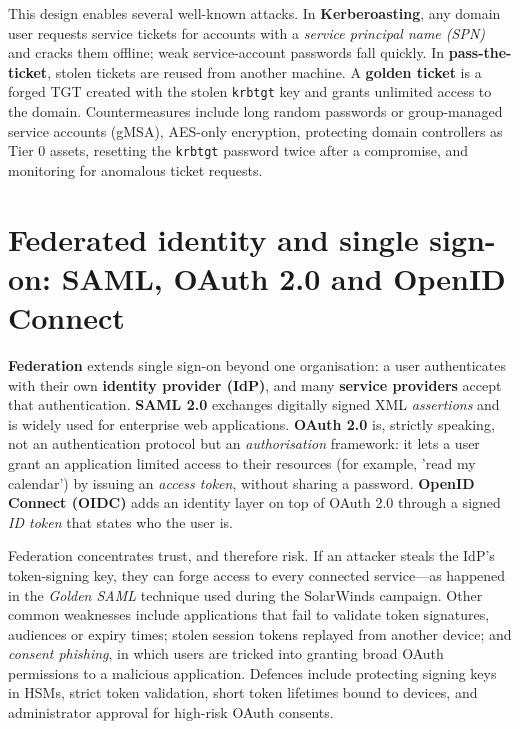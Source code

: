 \documentclass[11pt,openany]{book}
\begin{document}
This design enables several well-known attacks. In \textbf{Kerberoasting}, any domain user requests service tickets for accounts with a \emph{service principal name (SPN)} and cracks them offline; weak service-account passwords fall quickly. In \textbf{pass-the-ticket}, stolen tickets are reused from another machine. A \textbf{golden ticket} is a forged TGT created with the stolen \texttt{krbtgt} key and grants unlimited access to the domain. Countermeasures include long random passwords or group-managed service accounts (gMSA), AES-only encryption, protecting domain controllers as Tier 0 assets, resetting the \texttt{krbtgt} password twice after a compromise, and monitoring for anomalous ticket requests.

\section{Federated identity and single sign-on: SAML, OAuth 2.0 and OpenID Connect}\label{sec:8.6}
\textbf{Federation} extends single sign-on beyond one organisation: a user authenticates with their own \textbf{identity provider (IdP)}, and many \textbf{service providers} accept that authentication. \textbf{SAML 2.0} exchanges digitally signed XML \emph{assertions} and is widely used for enterprise web applications. \textbf{OAuth 2.0} is, strictly speaking, not an authentication protocol but an \emph{authorisation} framework: it lets a user grant an application limited access to their resources (for example, 'read my calendar') by issuing an \emph{access token}, without sharing a password. \textbf{OpenID Connect (OIDC)} adds an identity layer on top of OAuth 2.0 through a signed \emph{ID token} that states who the user is.

Federation concentrates trust, and therefore risk. If an attacker steals the IdP's token-signing key, they can forge access to every connected service—as happened in the \emph{Golden SAML} technique used during the SolarWinds campaign. Other common weaknesses include applications that fail to validate token signatures, audiences or expiry times; stolen session tokens replayed from another device; and \emph{consent phishing}, in which users are tricked into granting broad OAuth permissions to a malicious application. Defences include protecting signing keys in HSMs, strict token validation, short token lifetimes bound to devices, and administrator approval for high-risk OAuth consents.
\end{document}
